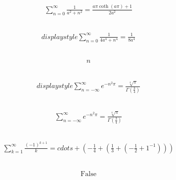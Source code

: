 \documentclass[12pt]{article}
\begin{document}
\subsection{}
\begin{align*}
\sum_{n=0}^{\infty} \frac{1}{a^{2} + n^{2}} = \frac{a \pi \coth{\left(a \pi \right)} + 1}{2 a^{2}}
\end{align*}
\vspace{1cm}
\subsection{}
\begin{align*}
displaystyle \sum_{n=0}^{\infty} \frac{1}{4 a^{4} + n^{4}} = \frac{1}{8 a^{4}}
\end{align*}
\vspace{1cm}
\subsection{}
\begin{align*}
n
\end{align*}
\vspace{1cm}
\subsection{}
\begin{align*}
displaystyle \sum_{n=-\infty}^{\infty} e^{- n^{2} \pi} = \frac{\sqrt[4]{\pi}}{\Gamma{\left(\frac{3}{4} \right)}}
\end{align*}
\vspace{1cm}
\subsection{}
\begin{align*}
\sum_{n=-\infty}^{\infty} e^{- n^{2} \pi} = \frac{\sqrt[4]{\pi}}{\Gamma{\left(\frac{3}{4} \right)}}
\end{align*}
\vspace{1cm}
\subsection{}
\begin{align*}
\sum_{k=1}^{\infty} \frac{\left(-1\right)^{k + 1}}{k} = cdots + \left(- \frac{1}{4} + \left(\frac{1}{3} + \left(- \frac{1}{2} + 1^{-1}\right)\right)\right)
\end{align*}
\vspace{1cm}
\subsection{}
\begin{align*}
\text{False}
\end{align*}
\vspace{1cm}
\end{document}

